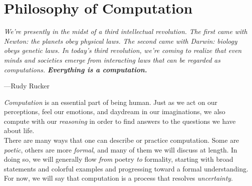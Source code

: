 \newpage


\part*{Philosophy of Computation}

\vspace{4mm}
\begin{displayquote}
	\textit{We're presently in the midst of a third intellectual revolution. The first came with Newton: the planets obey physical laws. The second came with Darwin: biology obeys genetic laws. In today’s third revolution, we're coming to realize that even minds and societies emerge from interacting laws that can be regarded as computations. \textbf{Everything is a computation.}}
	\begin{flushright}
		---Rudy Rucker
	\end{flushright}
\end{displayquote}
\vspace{4mm}


\textit{Computation} is an essential part of being human. Just as we act on our perceptions, feel our emotions, and daydream in our imaginations, we also compute with our \textit{reasoning} in order to find answers to the questions we have about life. \\

There are many ways that one can describe or practice computation. Some are \textit{poetic}, others are more \textit{formal}, and many of them we will discuss at length. In doing so, we will generally flow \textit{from} poetry \textit{to} formality, starting with broad statements and colorful examples and progressing toward a formal understanding. For now, we will say that computation is a process that resolves \textit{uncertainty}. \\

